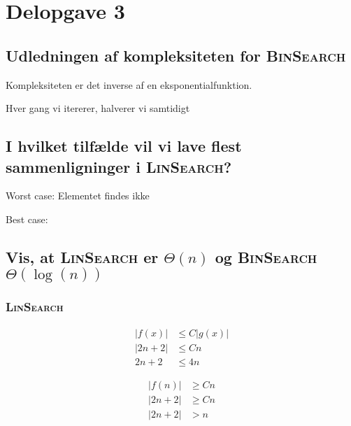 \section{Delopgave 3}\label{sec:delopgave-32}

\subsection{Udledningen af kompleksiteten for \textsc{BinSearch}}
\label{subsec:udledningen-af-kompleksiteten-for-binsearch}

Kompleksiteten er det inverse af en eksponentialfunktion.

Hver gang vi itererer, halverer vi samtidigt

\subsection{I hvilket tilfælde vil vi lave flest sammenligninger i \textsc{LinSearch}?}
\label{subsec:i-hvilket-tilflde-vil-vi-lave-flest-sammenligninger-i-linsearch}

Worst case: Elementet findes ikke

Best case:

\subsection{Vis, at \textsc{LinSearch} er \(\Theta(n)\) og \textsc{BinSearch} \(\Theta(\log(n))\)}
\label{subsec:vis-at-linsearch-er-theta-n-og-binsearch-theta-log-n}

\subsubsection{\textsc{LinSearch}}

\begin{equation}
    \begin{aligned}
        | f(x) | & \leq C | g(x) | \\
        | 2n + 2 | & \leq Cn \\
        2n + 2 & \leq 4n
    \end{aligned}\label{eq:equation13}
\end{equation}

\begin{equation}
    \begin{aligned}
        | f(n) | & \geq Cn \\
        | 2n + 2 | & \geq Cn \\
        | 2n + 2 | & > n
    \end{aligned}\label{eq:equation14}
\end{equation}

